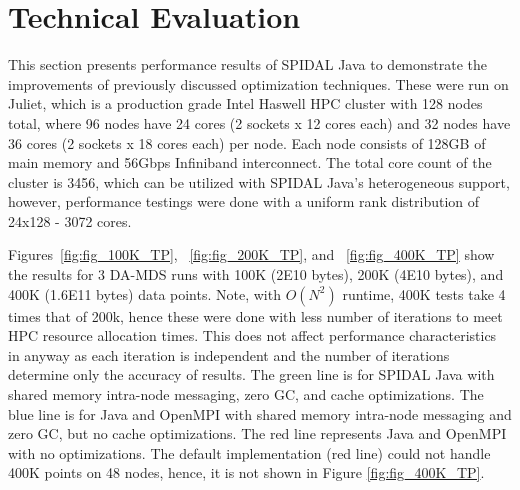 \chapter{Technical Evaluation} 
\label{sec:eval}

This section presents performance results of SPIDAL Java to demonstrate the improvements of previously discussed optimization techniques. These were run on Juliet, which is a production grade Intel Haswell HPC cluster with 128 nodes total, where 96 nodes have 24 cores (2 sockets x 12 cores each) and 32 nodes have 36 cores (2 sockets x 18 cores each) per node. Each node consists of 128GB of main memory and 56Gbps Infiniband interconnect. The total core count of the cluster is 3456, which can be utilized with SPIDAL Java's heterogeneous support, however, performance testings were done with a uniform rank distribution of 24x128 - 3072 cores. 

Figures~\ref{fig:fig_100K_TP}, ~\ref{fig:fig_200K_TP}, and ~\ref{fig:fig_400K_TP} show the results for 3 DA-MDS runs with 100K (2E10 bytes), 200K (4E10 bytes), and 400K (1.6E11 bytes) data points. Note, with $O(N^2)$ runtime, 400K tests take 4 times that of 200k, hence these were done with less number of iterations to meet HPC resource allocation times. This does not affect performance characteristics in anyway as each iteration is independent and the number of iterations determine only the accuracy of results. The green line is for SPIDAL Java with shared memory intra-node messaging, zero GC, and cache optimizations. The blue line is for Java and OpenMPI with shared memory intra-node messaging and zero GC, but no cache optimizations. The red line represents Java and OpenMPI with no optimizations. The default implementation (red line) could not handle 400K points on 48 nodes, hence, it is not shown in Figure \ref{fig:fig_400K_TP}. 

